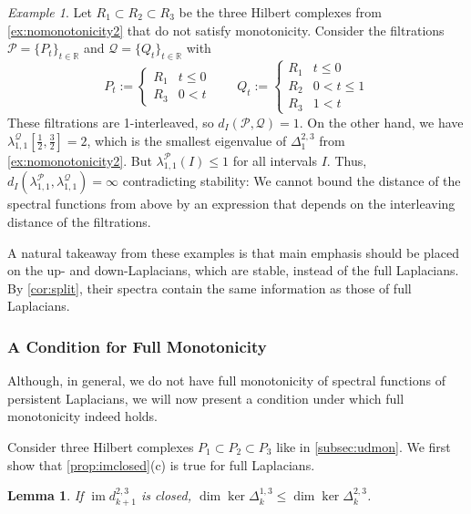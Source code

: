 \documentclass[11pt]{article}
\newtheorem{lemma}[theorem]{Lemma}
\theoremstyle{definition}
\theoremstyle{remark}
\newtheorem{example}[theorem]{Example}
\DeclareMathOperator{\im}{im}
\newcommand{\Pp}{\mathcal{P}}
\newcommand{\Qq}{\mathcal{Q}}
\newcommand{\R}{\mathbb{R}}
\begin{document}
\begin{example} \label{ex:nofullstab}
    Let $R_1 \subset R_2 \subset R_3$ be the three Hilbert complexes from \cref{ex:nomonotonicity2} that do not satisfy monotonicity. Consider the filtrations $\Pp=\{P_t\}_{t \in \R}$ and $\Qq=\{Q_t\}_{t \in \R}$ with
    $$
        P_t := \begin{cases}
            R_1 & t\le 0\\
            R_3 & 0<t
        \end{cases} \qquad Q_t:= \begin{cases}
            R_1 & t\le 0\\
            R_2 & 0<t\le 1\\
            R_3 & 1<t
        \end{cases}
    $$
    These filtrations are 1-interleaved, so $d_I(\Pp,\Qq)=1$. On the other hand, we have $\lambda_{1,1}^\Qq{[\frac 1 2,\frac 3 2]}=2$, which is the smallest eigenvalue of $\Delta_1^{2,3}$ from \cref{ex:nomonotonicity2}. But $\lambda_{1,1}^\Pp{(I)}\le 1$ for all intervals $I$. Thus, $d_I(\lambda_{1,1}^\Pp,\lambda_{1,1}^\Qq)=\infty$ contradicting stability: We cannot bound the distance of the spectral functions from above by an expression that depends on the interleaving distance of the filtrations. 
\end{example}

A natural takeaway from these examples is that main emphasis should be placed on the up- and down-Laplacians, which are stable, instead of the full Laplacians. By \cref{cor:split}, their spectra contain the same information as those of full Laplacians.

\subsubsection{A Condition for Full Monotonicity}\label{subsub:confitionfm}

Although, in general, we do not have full monotonicity of spectral functions of persistent Laplacians, we will now present a condition under which full monotonicity indeed holds. 

Consider three Hilbert complexes $P_1 \subset P_2 \subset P_3$ like in \cref{subsec:udmon}. We first show that \cref{prop:imclosed}(c) is true for full Laplacians.

    \begin{lemma}\label{closed range for full}
        If $\im d^{2,3}_{k+1}$ is closed, $\dim\ker\Delta^{1,3}_k\leq\dim\ker\Delta^{2,3}_k$.
    \end{lemma}
    
\end{document}
